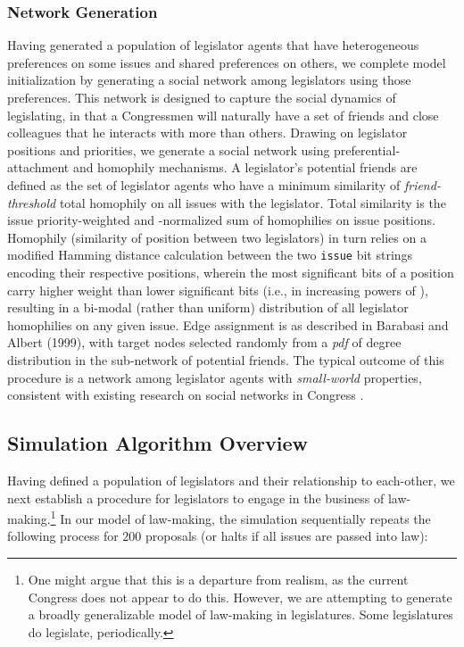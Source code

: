 \documentclass[pdftex,12pt]{llncs}
\begin{document}
\subsubsection{Network Generation}
Having generated a population of legislator agents that have heterogeneous preferences on some issues and shared preferences on others, we complete model initialization by generating a social network among legislators using those preferences.
This network is designed to capture the social dynamics of legislating, in that a Congressmen will naturally have a set of friends and close colleagues that he interacts with more than others.
Drawing on legislator positions and priorities, we generate a social network using preferential-attachment and homophily mechanisms.
A legislator's potential friends are defined as the set of legislator agents who have a minimum similarity of \textit{friend-threshold} total homophily on all issues with the legislator. Total similarity is the issue priority-weighted and -normalized sum of homophilies on issue positions. Homophily (similarity of position between two legislators) in turn relies on a modified Hamming distance calculation between the two \texttt{issue} bit strings encoding their respective positions, wherein the most significant bits of a position carry higher weight than lower significant bits (i.e., in increasing powers of ), resulting in a bi-modal (rather than uniform) distribution of all legislator homophilies on any given issue.
Edge assignment is as described in Barabasi and Albert (1999), with target nodes selected randomly from a \textit{pdf} of degree distribution in the sub-network of potential friends.
The typical outcome of this procedure is a network among legislator agents with \textit{small-world} properties, consistent with existing research on social networks in Congress \parencite{Granovetter1978}.

\subsection{Simulation Algorithm Overview}
Having defined a population of legislators and their relationship to each-other, we next establish a procedure for legislators to engage in the business of law-making.\footnote{One might argue that this is a departure from realism, as the current Congress does not appear to do this. However, we are attempting to generate a broadly generalizable model of law-making in legislatures. Some legislatures do legislate, periodically.} In our model of law-making, the simulation sequentially repeats the following process for 200 proposals (or halts if all issues are passed into law):
\end{document}
